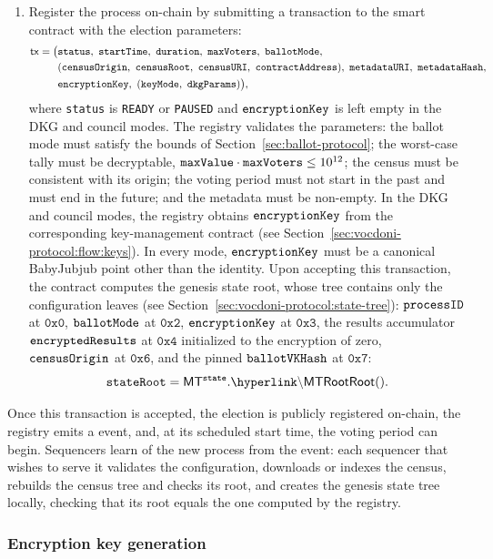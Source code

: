 \begin{enumerate}
	\item Register the process on-chain by submitting a transaction to the
	\hlget{\processregistry} smart contract with the election parameters:
	\begin{align*}
		\mathsf{tx} = \big(
		&\texttt{status},\ \starttime,\ \duration,\ \maxvoters,\ \ballotmode,\\
		&(\censusorigin,\ \censusroot,\ \censusuri,\ \texttt{contractAddress}),\ \metadatauri,\ \texttt{metadataHash},\\
		&\epk,\ (\keymode,\ \texttt{dkgParams})\big),
	\end{align*}
	where \texttt{status} is \texttt{READY} or \texttt{PAUSED} and $\texttt{encryptionKey}$ is left empty in the \ac{DKG} and council modes. The registry validates the parameters: the ballot mode must satisfy the bounds of Section~\ref{sec:ballot-protocol}; the worst-case tally must be decryptable, $\texttt{maxValue} \cdot \texttt{maxVoters} \le 10^{12}$; the census must be consistent with its origin; the voting period must not start in the past and must end in the future; and the metadata must be non-empty. In the \ac{DKG} and council modes, the registry obtains $\texttt{encryptionKey}$ from the corresponding key-management contract (see Section~\ref{sec:vocdoni-protocol:flow:keys}). In every mode, $\texttt{encryptionKey}$ must be a canonical BabyJubjub point other than the identity.
	Upon accepting this transaction, the \hlget{\processregistry} contract computes the genesis state root, whose tree contains only the configuration leaves (see Section~\ref{sec:vocdoni-protocol:state-tree}): $\texttt{processID}$ at $\mathtt{0x0}$, $\texttt{ballotMode}$ at $\mathtt{0x2}$, $\texttt{encryptionKey}$ at $\mathtt{0x3}$, the results accumulator $\texttt{encryptedResults}$ at $\mathtt{0x4}$ initialized to the encryption of zero, $\texttt{censusOrigin}$ at $\mathtt{0x6}$, and the pinned $\texttt{ballotVKHash}$ at $\mathtt{0x7}$:
	\[
	\stateroot = \stateTree.\hlget{\MTRoot}().
	\]
\end{enumerate}
%
Once this transaction is accepted, the election is publicly registered on-chain, the registry emits a  event, and, at its scheduled start time, the voting period can begin. Sequencers learn of the new process from the event: each sequencer that wishes to serve it validates the configuration, downloads or indexes the census, rebuilds the census tree and checks its root, and creates the genesis state tree locally, checking that its root equals the one computed by the registry.

\subsubsection{Encryption key generation}
\label{sec:vocdoni-protocol:keygen}
\label{sec:vocdoni-protocol:flow:keys}

